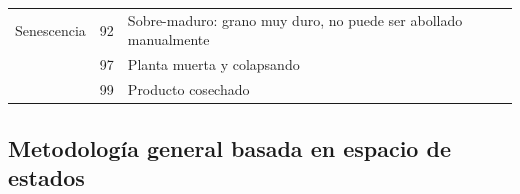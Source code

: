 \begin{longtable}{p{3cm}p{1cm}p{9cm}}
Senescencia                                & 92   & Sobre-maduro: grano muy duro, no puede ser abollado manualmente                                                                          \\
                                           & 97   & Planta muerta y colapsando                                                                                                               \\
                                           & 99   & Producto cosechado                                                                                                                     
                                           
\end{longtable}

\subsection{Metodología general basada en espacio de estados}


